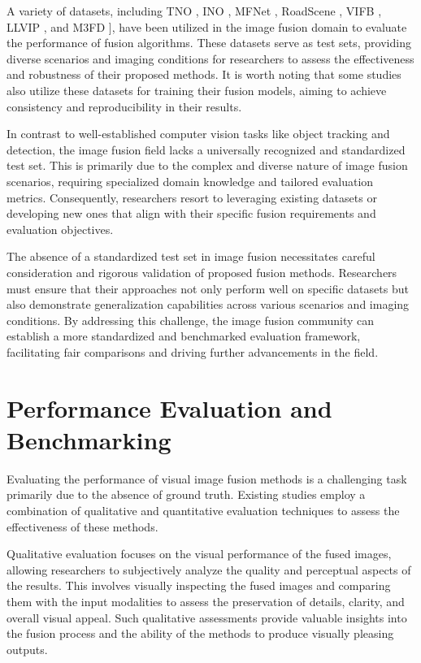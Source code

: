 A variety of datasets, including TNO \cite{toet2014tno}, INO \cite{inodataset}, MFNet \cite{ha2017mfnet}, RoadScene \cite{xu2020fusiondn}, VIFB \cite{zhang2020vifb}, LLVIP \cite{jia2021llvip}, and M3FD \cite{liu2022target}], have been utilized in the image fusion domain to evaluate the performance of fusion algorithms. These datasets serve as test sets, providing diverse scenarios and imaging conditions for researchers to assess the effectiveness and robustness of their proposed methods. It is worth noting that some studies also utilize these datasets for training their fusion models, aiming to achieve consistency and reproducibility in their results.

In contrast to well-established computer vision tasks like object tracking and detection, the image fusion field lacks a universally recognized and standardized test set. This is primarily due to the complex and diverse nature of image fusion scenarios, requiring specialized domain knowledge and tailored evaluation metrics. Consequently, researchers resort to leveraging existing datasets or developing new ones that align with their specific fusion requirements and evaluation objectives.

The absence of a standardized test set in image fusion necessitates careful consideration and rigorous validation of proposed fusion methods. Researchers must ensure that their approaches not only perform well on specific datasets but also demonstrate generalization capabilities across various scenarios and imaging conditions. By addressing this challenge, the image fusion community can establish a more standardized and benchmarked evaluation framework, facilitating fair comparisons and driving further advancements in the field.

\section{Performance Evaluation and Benchmarking}
\label{sec:Performance}

Evaluating the performance of visual image fusion methods is a challenging task primarily due to the absence of ground truth. Existing studies employ a combination of qualitative and quantitative evaluation techniques to assess the effectiveness of these methods.

Qualitative evaluation focuses on the visual performance of the fused images, allowing researchers to subjectively analyze the quality and perceptual aspects of the results. This involves visually inspecting the fused images and comparing them with the input modalities to assess the preservation of details, clarity, and overall visual appeal. Such qualitative assessments provide valuable insights into the fusion process and the ability of the methods to produce visually pleasing outputs.

